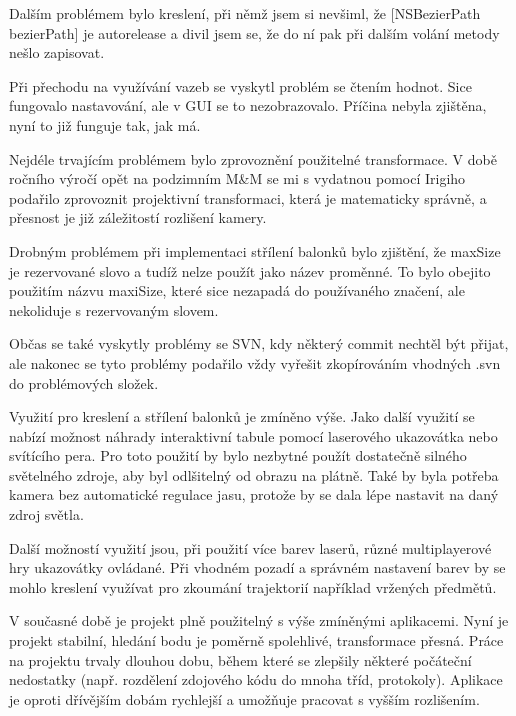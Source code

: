 \documentclass[twoside,12pt]{article}
\begin{document}
Dalším problémem bylo kreslení, při němž jsem si nevšiml, že [NSBezierPath bezierPath] je autorelease a divil jsem se, že do ní pak při dalším volání metody nešlo zapisovat.

Při přechodu na využívání vazeb se vyskytl problém se čtením hodnot. Sice fungovalo nastavování, ale v GUI se to nezobrazovalo. Příčina nebyla zjištěna, nyní to již funguje tak, jak má.

Nejdéle trvajícím problémem bylo zprovoznění použitelné transformace. V době ročního výročí opět na podzimním M\&M se mi s vydatnou pomocí Irigiho podařilo zprovoznit projektivní transformaci, která je matematicky správně, a přesnost je již záležitostí rozlišení kamery. 

Drobným problémem při implementaci střílení balonků bylo zjištění, že maxSize je rezervované slovo a tudíž nelze použít jako název proměnné. To bylo obejito použitím názvu maxiSize, které sice nezapadá do používaného značení, ale nekoliduje s rezervovaným slovem.

Občas se také vyskytly problémy se SVN, kdy některý commit nechtěl být přijat, ale nakonec se tyto problémy podařilo vždy vyřešit zkopírováním vhodných .svn do problémových složek.

Využití pro kreslení a střílení balonků je zmíněno výše. Jako další využití se nabízí možnost náhrady interaktivní tabule pomocí laserového ukazovátka nebo svítícího pera. Pro toto použití by bylo nezbytné použít dostatečně silného světelného zdroje, aby byl odlšitelný od obrazu na plátně. Také by byla potřeba kamera bez automatické regulace jasu, protože by se dala lépe nastavit na daný zdroj světla. 

Další možností využití jsou, při použití více barev laserů, různé multiplayerové hry ukazovátky ovládané. Při vhodném pozadí a správném nastavení barev by se mohlo kreslení využívat pro zkoumání trajektorií například vržených předmětů.

V současné době je projekt plně použitelný s výše zmíněnými aplikacemi. Nyní je projekt stabilní, hledání bodu je poměrně spolehlivé, transformace přesná. Práce na projektu trvaly dlouhou dobu, během které se zlepšily některé počáteční nedostatky (např. rozdělení zdojového kódu do mnoha tříd, protokoly). Aplikace je oproti dřívějším dobám rychlejší a umožňuje pracovat s vyšším rozlišením. 
\end{document}
